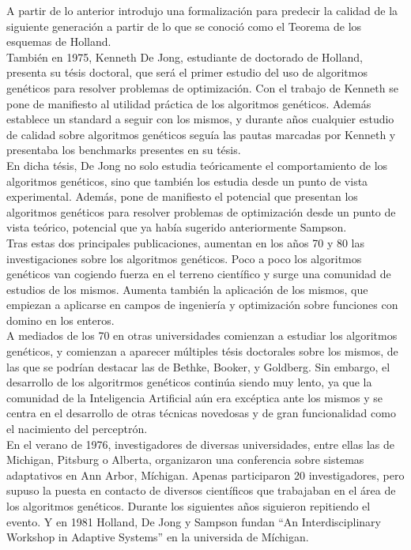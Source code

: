 \documentclass[12pt]{article} \usepackage[utf8x]{inputenc}
\begin{document}
A partir de lo anterior introdujo una formalización para predecir la calidad de 
la siguiente generación a partir de lo que se conoció como el Teorema de los 
esquemas de Holland.\\


También en 1975, Kenneth De Jong, estudiante de doctorado de Holland, presenta 
su tésis doctoral, que será el primer estudio del uso de algoritmos genéticos 
para resolver problemas de optimización. Con el trabajo de Kenneth se pone de 
manifiesto al utilidad práctica de los algoritmos genéticos. Además establece 
un standard a seguir con los mismos, y durante años cualquier estudio de calidad
sobre algoritmos genéticos seguía las pautas marcadas por Kenneth y presentaba 
los benchmarks presentes en su tésis.\\

En dicha tésis, De Jong no solo estudia teóricamente el comportamiento de los 
algoritmos genéticos, sino que también los estudia desde un punto de vista 
experimental. Además, pone de manifiesto el potencial que presentan los algoritmos 
genéticos para resolver problemas de optimización desde un punto de vista teórico, 
potencial que ya había sugerido anteriormente Sampson.\\

Tras estas dos principales publicaciones, aumentan en los años 70 y 80 las 
investigaciones sobre los algoritmos genéticos. Poco a poco los algoritmos genéticos van
cogiendo fuerza en el terreno científico y surge una comunidad de estudios de los mismos.
Aumenta también la aplicación de los mismos, que empiezan a aplicarse en campos de 
ingeniería y optimización sobre funciones con domino en los enteros.\\

A mediados de los 70 en otras universidades comienzan a estudiar los algoritmos genéticos,
y comienzan a aparecer múltiples tésis doctorales sobre los mismos, de las que se podrían 
destacar las de Bethke, Booker, y Goldberg. Sin embargo, el desarrollo de los algoritrmos 
genéticos continúa siendo muy lento, ya que la comunidad de la Inteligencia Artificial
aún era excéptica ante los mismos y se centra en el desarrollo de otras técnicas novedosas 
y de gran funcionalidad como el nacimiento del perceptrón.\\

En el verano de 1976, investigadores de diversas universidades, entre ellas las de Michigan, 
Pitsburg o  Alberta, organizaron una conferencia sobre sistemas adaptativos en Ann Arbor, 
Míchigan. Apenas participaron 20 investigadores, pero supuso la puesta en contacto de diversos 
científicos que trabajaban en el área de los algoritmos genéticos. Durante los siguientes 
años siguieron repitiendo el evento. Y en 1981 Holland, De Jong y Sampson fundan ``An 
Interdisciplinary Workshop in Adaptive Systems'' en la universida de Míchigan.\\
\end{document}
